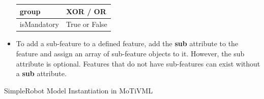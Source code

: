 \documentclass{article}
\newenvironment{longlisting}{\captionsetup{type=listing}}{}
\begin{document}
\begin{itemize}
\begin{table}[H]
\begin{tabular}{|l|p{10cm}|}
				group & XOR / OR \\ \hline
				isMandatory & True or False \\ \hline
				
			\end{tabular}
			\label{tab:valueTypes}
	\end{table}
	
	\item To add a sub-feature to a defined feature, add the \textbf{sub} attribute to the feature and assign an array of sub-feature objects to it. However, the sub attribute is optional. Features that do not have sub-features can exist without a \textbf{sub} attribute.
	
\end{itemize}


\begin{longlisting}
	\caption{SimpleRobot Model Instantiation in MoTiVML}
	\begin{verbatim}
		

\end{verbatim}
\end{longlisting}
\end{document}

